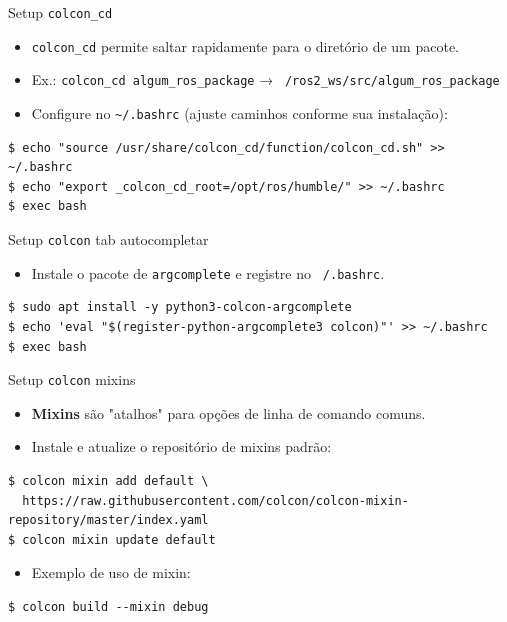 \begin{frame}[fragile]{Setup \texttt{colcon\_cd}}
  \begin{itemize}
    \item \texttt{colcon\_cd} permite saltar rapidamente para o diretório de um pacote.
    \item Ex.: \texttt{colcon\_cd algum\_ros\_package} → \texttt{~/ros2\_ws/src/algum\_ros\_package}
    \item Configure no \texttt{\textasciitilde/.bashrc} (ajuste caminhos conforme sua instalação):
  \end{itemize}

  \begin{lstlisting}[style=bashstyle]
$ echo "source /usr/share/colcon_cd/function/colcon_cd.sh" >> ~/.bashrc
$ echo "export _colcon_cd_root=/opt/ros/humble/" >> ~/.bashrc
$ exec bash
  \end{lstlisting}
\end{frame}

\begin{frame}[fragile]{Setup \texttt{colcon} tab autocompletar}
  \begin{itemize}
    \item Instale o pacote de \texttt{argcomplete} e registre no \texttt{~/.bashrc}.
  \end{itemize}

  \begin{lstlisting}[style=bashstyle]
$ sudo apt install -y python3-colcon-argcomplete
$ echo 'eval "$(register-python-argcomplete3 colcon)"' >> ~/.bashrc
$ exec bash
  \end{lstlisting}
\end{frame}

\begin{frame}[fragile]{Setup \texttt{colcon} mixins}
  \begin{itemize}
    \item \textbf{Mixins} são "atalhos" para opções de linha de comando comuns.
    \item Instale e atualize o repositório de mixins padrão:
  \end{itemize}

  \begin{lstlisting}[style=bashstyle]
$ colcon mixin add default \
  https://raw.githubusercontent.com/colcon/colcon-mixin-repository/master/index.yaml
$ colcon mixin update default
  \end{lstlisting}

  \vspace{0.4em}
  \begin{itemize}
    \item Exemplo de uso de mixin:
  \end{itemize}

  \begin{lstlisting}[style=bashstyle]
$ colcon build --mixin debug
  \end{lstlisting}
\end{frame}

